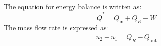 The equation for energy balance is written as:  
\[
\dot{Q}^* = \dot{Q}_{\text{in}} + \dot{Q}_R - \dot{W}
\]  
The mass flow rate is expressed as:  
\[
u_2 - u_1 = \dot{Q}_R - \dot{Q}_{\text{out}}
\]